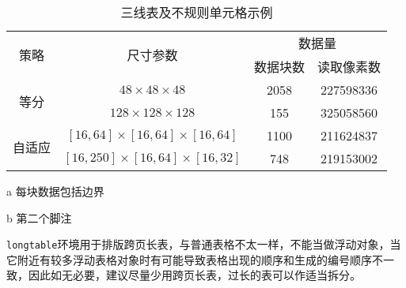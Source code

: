 \begin{table}[htbp]
\centering
  \begin{threeparttable}
    \newcommand{\chengs}{\ensuremath{\times}}
    \newcommand{\cheng}{\ensuremath{\!\times\!}}
    \caption{三线表及不规则单元格示例}\label{tab:samples:threepart}
    \begin{tabular}{cccc} %
      \toprule
  \multirow{2}{*}{策略}   & \multirow{2}{*}{尺寸参数}             & \multicolumn{2}{c}{数据量}    \tabularnewline \cmidrule{3-4}
                         &                                      & 数据块数\tnote{a} & 读取像素数\tnote{b} \tabularnewline \midrule
  \multirow{2}{*}{等分}   & $48\chengs 48\chengs 48$             & 2058             & 227598336 \tabularnewline \cmidrule{2-4} %
                         & $128\chengs 128\chengs 128$          & 155              & 325058560 \tabularnewline \midrule
  \multirow{2}{*}{自适应} & $[16,64]\cheng[16,64]\cheng[16,64]$  & 1100             & 211624837  \tabularnewline \cmidrule{2-4}
                         & $[16,250]\cheng[16,64]\cheng[16,32]$ & 748              & 219153002  \tabularnewline %
      \bottomrule
    \end{tabular}
    \begin{tablenotes}\small
      \item[a] 每块数据包括边界
      \item[b] 第二个脚注
    \end{tablenotes}
  \end{threeparttable}
\end{table}

\texttt{longtable}环境用于排版跨页长表，与普通表格不太一样，不能当做浮动对象，当它附近有较多浮动表格对象时有可能导致表格出现的顺序和生成的编号顺序不一致，因此如无必要，建议尽量少用跨页长表，过长的表可以作适当拆分。

